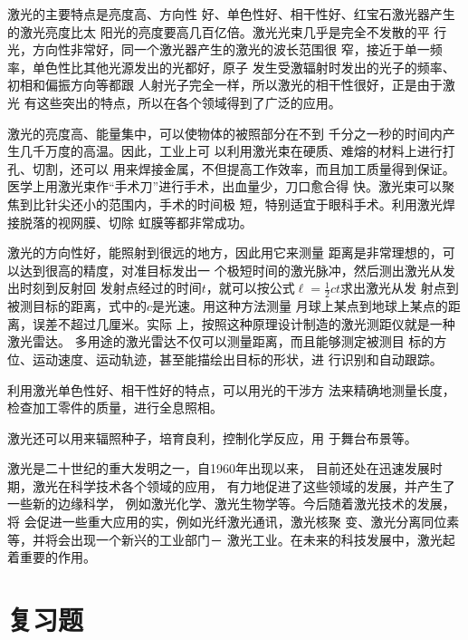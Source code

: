 激光的主要特点是亮度高、方向性
好、单色性好、相干性好、红宝石激光器产生的激光亮度比太
阳光的亮度要高几百亿倍。激光光束几乎是完全不发散的平
行光，方向性非常好，同一个激光器产生的激光的波长范围很
窄，接近于单一频率，单色性比其他光源发出的光都好，原子
发生受激辐射时发出的光子的频率、初相和偏振方向等都跟
人射光子完全一样，所以激光的相干性很好，正是由于激光
有这些突出的特点，所以在各个领域得到了广泛的应用。

激光的亮度高、能量集中，可以使物体的被照部分在不到
千分之一秒的时间内产生几千万度的高温。因此，工业上可
以利用激光束在硬质、难熔的材料上进行打孔、切割，还可以
用来焊接金属，不但提高工作效率，而且加工质量得到保证。
医学上用激光束作“手术刀”进行手术，出血量少，刀口愈合得
快。激光束可以聚焦到比针尖还小的范围内，手术的时间极
短，特别适宜于眼科手术。利用激光焊接脱落的视网膜、切除
虹膜等都非常成功。

激光的方向性好，能照射到很远的地方，因此用它来测量
距离是非常理想的，可以达到很高的精度，对准目标发出一
个极短时间的激光脉冲，然后测出激光从发出时刻到反射回
发射点经过的时间$t$，就可以按公式$\ell=\frac{1}{2}ct$求出激光从发
射点到被测目标的距离，式中的$c$是光速。用这种方法测量
月球上某点到地球上某点的距离，误差不超过几厘米。实际
上，按照这种原理设计制造的激光测距仪就是一种激光雷达。
多用途的激光雷达不仅可以测量距离，而且能够测定被测目
标的方位、运动速度、运动轨迹，甚至能描绘出目标的形状，进
行识别和自动跟踪。

利用激光单色性好、相干性好的特点，可以用光的干涉方
法来精确地测量长度，检查加工零件的质量，进行全息照相。

激光还可以用来辐照种子，培育良利，控制化学反应，用
于舞台布景等。

激光是二十世纪的重大发明之一，自1960年出现以来，
目前还处在迅速发展时期，激光在科学技术各个领域的应用，
有力地促进了这些领域的发展，并产生了一些新的边缘科学，
例如激光化学、激光生物学等。今后随着激光技术的发展，将
会促进一些重大应用的实，例如光纤激光通讯，激光核聚
变、激光分离同位素等，并将会出现一个新兴的工业部门－
激光工业。在未来的科技发展中，激光起着重要的作用。

\section*{复习题}

